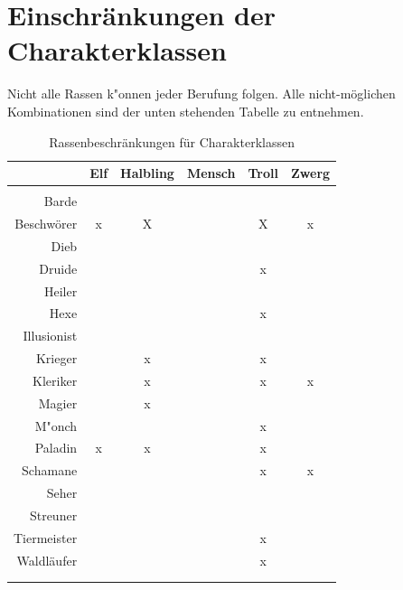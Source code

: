 \newpage


\newpage


\newpage


\newpage


\newpage


\newpage
\section{Einschränkungen der Charakterklassen}
\par Nicht alle Rassen k"onnen jeder Berufung folgen.
Alle nicht-möglichen Kombinationen sind der unten stehenden Tabelle
zu entnehmen.
\begin{longtable}{r|c|c|c|c|c}
            & Elf & Halbling & Mensch & Troll & Zwerg \\
\hline
\hline
            &   &   &   &   &   \\
Barde       &   &   &   &   &   \\
Beschwörer  & x & X &   & X & x \\
Dieb        &   &   &   &   &   \\
Druide      &   &   &   & x &   \\
Heiler      &   &   &   &   &   \\
Hexe        &   &   &   & x &   \\
Illusionist &   &   &   &   &   \\
Krieger     &   & x &   & x &   \\
Kleriker    &   & x &   & x & x \\
Magier      &   & x &   &   &   \\
M"onch      &   &   &   & x &   \\
Paladin     & x & x &   & x &   \\
Schamane    &   &   &   & x & x \\
Seher       &   &   &   &   &   \\
Streuner    &   &   &   &   &   \\
Tiermeister &   &   &   & x &   \\
Waldläufer  &   &   &   & x &   \\
            &   &   &   &   &   \\
\caption{Rassenbeschränkungen für Charakterklassen}
\label{tabelle_rassenbeschraenkungen}
\end{longtable}
